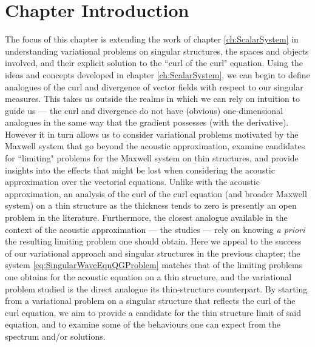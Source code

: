 \section{Chapter Introduction} \label{sec:Curl-Intro}
The focus of this chapter is extending the work of chapter \ref{ch:ScalarSystem} in understanding variational problems on singular structures, the spaces and objects involved, and their explicit solution to the ``curl of the curl" equation.
Using the ideas and concepts developed in chapter \ref{ch:ScalarSystem}, we can begin to define analogues of the curl and divergence of vector fields with respect to our singular measures.
This takes us outside the realms in which we can rely on intuition to guide us --- the curl and divergence do not have (obvious) one-dimensional analogues in the same way that the gradient possesses (with the derivative).
However it in turn allows us to consider variational problems motivated by the Maxwell system that go beyond the acoustic approximation, examine candidates for ``limiting" problems for the Maxwell system on thin structures, and provide insights into the effects that might be lost when considering the acoustic approximation over the vectorial equations.
Unlike with the acoustic approximation, an analysis of the curl of the curl equation (and broader Maxwell system) on a thin structure as the thickness tends to zero is presently an open problem in the literature.
Furthermore, the closest analogue available in the context of the acoustic approximation --- the studies \cite{kuchment2001convergence, kuchment2003asymptotics, exner2005convergence} --- rely on knowing \emph{a priori} the resulting limiting problem one should obtain.
Here we appeal to the success of our variational approach and singular structures in the previous chapter; the system \eqref{eq:SingularWaveEqnQGProblem} matches that of the limiting problems one obtains for the acoustic equation on a thin structure, and the variational problem studied is the direct analogue its thin-structure counterpart.
By starting from a variational problem on a singular structure that reflects the curl of the curl equation, we aim to provide a candidate for the thin structure limit of said equation, and to examine some of the behaviours one can expect from the spectrum and/or solutions.

